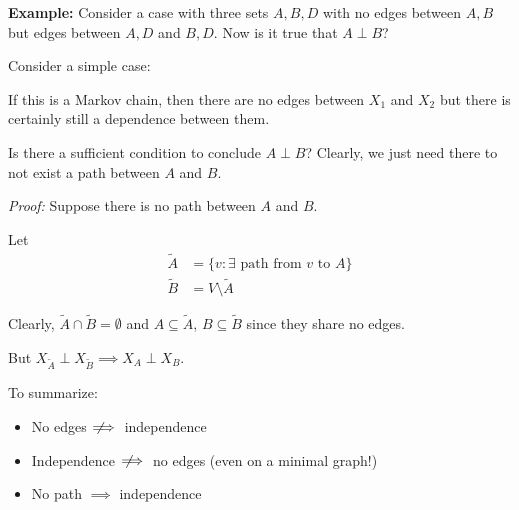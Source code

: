 \documentclass[12pt]{report}
\newcommand{\sub}{\subseteq}
\newcommand*{\tbf}[1]{\ifmmode\mathbf{#1}\else\textbf{#1}\fi}
\newcommand{\notimplies}{\;\not\!\!\!\implies}
\newenvironment*{proof}[1][blue]{
\begin{tcolorbox}[
    parbox=false,
    colback=#1!5!white,
    colframe=#1!75!black,
    breakable
]}
{\end{tcolorbox}}
\begin{document}
\tbf{Example:} Consider a case with three sets $A, B, D$ with no edges between $A, B$ but edges between $A, D$ and $B, D$. Now is it true that $A \perp B$?

\begin{center}
\end{center}

Consider a simple case:
\begin{center}
\end{center}

If this is a Markov chain, then there are no edges between $X_1$ and $X_2$ but there is certainly still a dependence between them.

Is there a sufficient condition to conclude $A \perp B$? Clearly, we just need there to not exist a path between $A$ and $B$.

\begin{proof}
    \emph{Proof:} Suppose there is no path between $A$ and $B$.

    Let
    \begin{align*}
        \tilde A & = \{v: \exists \text{ path from } v \text{ to } A\} \\
        \tilde B & = V \setminus \tilde A
    \end{align*}

    Clearly, $\tilde A \cap \tilde B = \emptyset$ and $A \sub \tilde A$, $B \sub \tilde B$ since they share no edges.

    But $X_{\tilde A} \perp X_{\tilde B} \implies X_A \perp X_B$.
\end{proof}

To summarize:
\begin{itemize}
    \item No edges $\notimplies$ independence
    \item Independence $\notimplies$ no edges (even on a minimal graph!)
    \item No path $\implies$ independence
\end{itemize}
\end{document}
